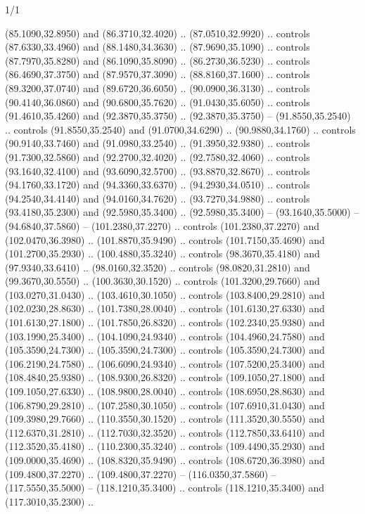 \begin{flagdescription}{1/1}
\begin{scope}[xshift=0.75\flaglength]
\begin{scope}[scale=0.00209\flagwidth,yshift=134.4mm,xshift=-29.7mm]
\begin{scope}[y=0.80pt, x=0.80pt, yscale=-1, xscale=1, inner sep=0pt, outer sep=0pt,line width=0.0015\flagwidth]
  (85.1090,32.8950) and (86.3710,32.4020) .. (87.0510,32.9920) .. controls
  (87.6330,33.4960) and (88.1480,34.3630) .. (87.9690,35.1090) .. controls
  (87.7970,35.8280) and (86.1090,35.8090) .. (86.2730,36.5230) .. controls
  (86.4690,37.3750) and (87.9570,37.3090) .. (88.8160,37.1600) .. controls
  (89.3200,37.0740) and (89.6720,36.6050) .. (90.0900,36.3130) .. controls
  (90.4140,36.0860) and (90.6800,35.7620) .. (91.0430,35.6050) .. controls
  (91.4610,35.4260) and (92.3870,35.3750) .. (92.3870,35.3750) --
  (91.8550,35.2540) .. controls (91.8550,35.2540) and (91.0700,34.6290) ..
  (90.9880,34.1760) .. controls (90.9140,33.7460) and (91.0980,33.2540) ..
  (91.3950,32.9380) .. controls (91.7300,32.5860) and (92.2700,32.4020) ..
  (92.7580,32.4060) .. controls (93.1640,32.4100) and (93.6090,32.5700) ..
  (93.8870,32.8670) .. controls (94.1760,33.1720) and (94.3360,33.6370) ..
  (94.2930,34.0510) .. controls (94.2540,34.4140) and (94.0160,34.7620) ..
  (93.7270,34.9880) .. controls (93.4180,35.2300) and (92.5980,35.3400) ..
  (92.5980,35.3400) -- (93.1640,35.5000) -- (94.6840,37.5860) --
  (101.2380,37.2270) .. controls (101.2380,37.2270) and (102.0470,36.3980) ..
  (101.8870,35.9490) .. controls (101.7150,35.4690) and (101.2700,35.2930) ..
  (100.4880,35.3240) .. controls (98.3670,35.4180) and (97.9340,33.6410) ..
  (98.0160,32.3520) .. controls (98.0820,31.2810) and (99.3670,30.5550) ..
  (100.3630,30.1520) .. controls (101.3200,29.7660) and (103.0270,31.0430) ..
  (103.4610,30.1050) .. controls (103.8400,29.2810) and (102.0230,28.8630) ..
  (101.7380,28.0040) .. controls (101.6130,27.6330) and (101.6130,27.1800) ..
  (101.7850,26.8320) .. controls (102.2340,25.9380) and (103.1990,25.3400) ..
  (104.1090,24.9340) .. controls (104.4960,24.7580) and (105.3590,24.7300) ..
  (105.3590,24.7300) .. controls (105.3590,24.7300) and (106.2190,24.7580) ..
  (106.6090,24.9340) .. controls (107.5200,25.3400) and (108.4840,25.9380) ..
  (108.9300,26.8320) .. controls (109.1050,27.1800) and (109.1050,27.6330) ..
  (108.9800,28.0040) .. controls (108.6950,28.8630) and (106.8790,29.2810) ..
  (107.2580,30.1050) .. controls (107.6910,31.0430) and (109.3980,29.7660) ..
  (110.3550,30.1520) .. controls (111.3520,30.5550) and (112.6370,31.2810) ..
  (112.7030,32.3520) .. controls (112.7850,33.6410) and (112.3520,35.4180) ..
  (110.2300,35.3240) .. controls (109.4490,35.2930) and (109.0000,35.4690) ..
  (108.8320,35.9490) .. controls (108.6720,36.3980) and (109.4800,37.2270) ..
  (109.4800,37.2270) -- (116.0350,37.5860) -- (117.5550,35.5000) --
  (118.1210,35.3400) .. controls (118.1210,35.3400) and (117.3010,35.2300) ..

\end{scope}
\end{scope}
\end{scope}
\end{flagdescription}
